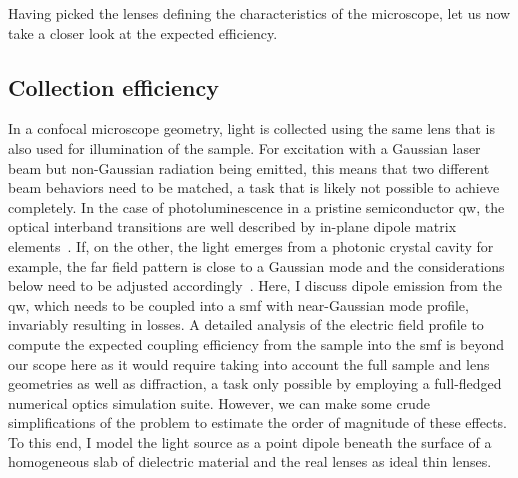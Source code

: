 Having picked the lenses defining the characteristics of the microscope, let us now take a closer look at the expected efficiency.

\subsection{Collection efficiency}\label{subsec:setup:optics:coupling:efficiency}
In a confocal microscope geometry, light is collected using the same lens that is also used for illumination of the sample.
For excitation with a Gaussian laser beam but non-Gaussian radiation being emitted, this means that two different beam behaviors need to be matched, a task that is likely not possible to achieve completely.
In the case of photoluminescence in a pristine semiconductor \gls{qw}, the optical interband transitions are well described by in-plane dipole matrix elements~\cite{Gu2013}.
If, on the other, the light emerges from a photonic crystal cavity for example, the far field pattern is close to a Gaussian mode and the considerations below need to be adjusted accordingly~\cite{Wu2024a}.
Here, I discuss dipole emission from the \gls{qw}, which needs to be coupled into a \gls{smf} with near-Gaussian mode profile, invariably resulting in losses.
A detailed analysis of the electric field profile to compute the expected coupling efficiency from the sample into the \gls{smf} is beyond our scope here as it would require taking into account the full sample and lens geometries as well as diffraction, a task only possible by employing a full-fledged numerical optics simulation suite.
However, we can make some crude simplifications of the problem to estimate the order of magnitude of these effects.
To this end, I model the light source as a point dipole beneath the surface of a homogeneous slab of dielectric material and the real lenses as ideal thin lenses.

\begin{marginfigure}
    
    \caption[]{
        Sketch of a light source located inside a dielectric medium ($z < 0, n > 1$) emitting light in the upwards direction to collection by an objective lens in air ($z > 0, n = 1$).
        The red line indicates the marginal ray of the lens with focal length \fob and \gls{ca} $2w$.
    }
    \label{fig:setup:optics:coupling:emission}
\end{marginfigure}

